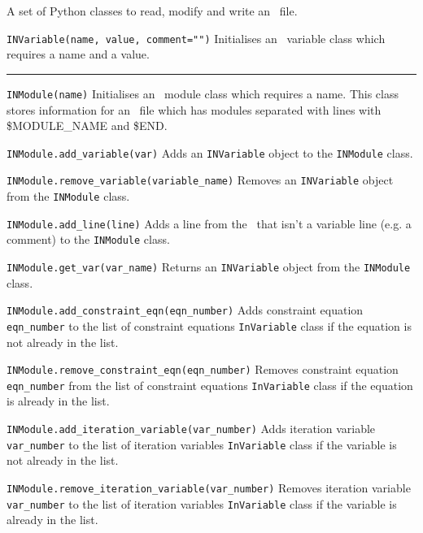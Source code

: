 A set of Python classes to read, modify and write an \indat\ file.

\begin{description}

\item{\verb|INVariable(name, value, comment="")| } Initialises an \indat\
  variable class which requires a name and a value.

\end{description}

\rule{\textwidth}{0.4pt}

\begin{description}

\item{\verb|INModule(name)|} Initialises an \indat\ module class which
  requires a name. This class stores information for an \indat\ file which has
  modules separated with lines with \$MODULE\_NAME and \$END.

\item{\verb|INModule.add_variable(var)|} Adds an \verb|INVariable| object to
  the \verb|INModule| class.

\item{\verb|INModule.remove_variable(variable_name)|} Removes an
  \verb|INVariable| object from the \verb|INModule| class.

\item{\verb|INModule.add_line(line)|} Adds a line from the \indat\ that isn't
  a variable line (e.g. a comment) to the \verb|INModule| class.

\item{\verb|INModule.get_var(var_name)|} Returns an \verb|INVariable| object
  from the \verb|INModule| class.

\item{\verb|INModule.add_constraint_eqn(eqn_number)|} Adds constraint
  equation \verb|eqn_number| to the list of constraint equations
  \verb|InVariable| class if the equation is not already in the list.

\item{\verb|INModule.remove_constraint_eqn(eqn_number)|} Removes
  constraint equation \verb|eqn_number| from the list of constraint
  equations \verb|InVariable| class if the equation is already in the list.

\item{\verb|INModule.add_iteration_variable(var_number)|} Adds iteration
  variable \verb|var_number| to the list of iteration variables
  \verb|InVariable| class if the variable is not already in the list.

\item{\verb|INModule.remove_iteration_variable(var_number)|} Removes
  iteration variable \verb|var_number| to the list of iteration variables
  \verb|InVariable| class if the variable is already in the list.

\end{description}

